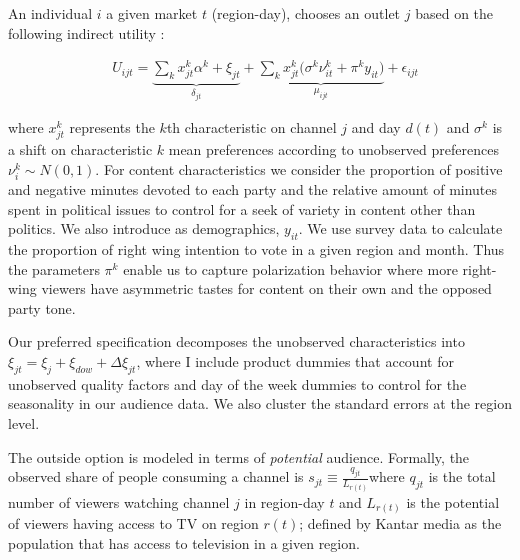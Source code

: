 \documentclass[12pt]{article}
\begin{document}
	
	
	
	
	
	
	
	An individual $ i $  a given market $ t $ (region-day), chooses an outlet $ j $ based on the following indirect utility : 
	
	
	\begin{equation}\label{eq:utility}
		\begin{aligned}
			& U_{ijt}= \underbrace{\sum_k x_{jt}^k\alpha^k+ \xi_{jt}}_{\delta_{jt}}  + \underbrace{  \sum_k x_{jt}^k \Big( \sigma^k \nu_{it}^k  + \pi^ky_{it} \Big)}_{\mu_{ijt}}+\epsilon_{ijt} 
		\end{aligned}
	\end{equation} 
	
	where $ x_{jt}^k $ represents the $ k $th characteristic on channel $ j $ and day $ d(t) $ and $ \sigma^k $ is a shift on characteristic $ k $ mean preferences according to unobserved preferences $ \nu_{i}^k \sim N(0,1)$. For content characteristics we consider the proportion of positive and negative minutes devoted to each party and the relative amount  of minutes spent in political issues to control for a seek of variety in content other than politics.  We also introduce as demographics, $ y_{it} $. We use survey data to calculate the proportion of right wing intention to vote in a given region and month. Thus the parameters $\pi^k$ enable us to capture polarization behavior where more right-wing viewers have asymmetric tastes for content on their own and the opposed party tone. 
	
	Our preferred specification decomposes the unobserved characteristics into $\xi_{jt}= \xi_j + \xi_{dow} + \Delta \xi_{jt}$, where I include product dummies that account for unobserved quality factors and day of the week dummies to control for the seasonality in our audience data. We also cluster the standard errors at the region level. 
	
	The outside option is modeled in terms of \textit{potential} audience. Formally, the observed share of people consuming a channel  is $ s_{jt}\equiv \frac{q_{jt}}{L_{r(t)}}$where $ q_{jt} $ is the total number of viewers watching channel $ j $ in region-day $ t $ and  $ L_{r(t)} $ is the potential of viewers having access to TV on region $ r(t) $; defined by Kantar media as the population that has access to television in a given region. 
	
\end{document}
